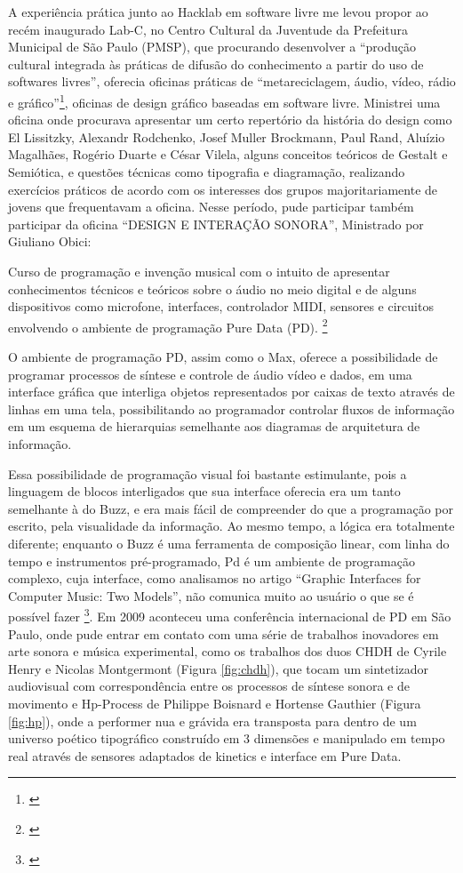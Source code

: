A experiência prática junto ao Hacklab em software livre me levou propor ao recém inaugurado Lab-C, no Centro Cultural da Juventude da Prefeitura Municipal de São Paulo (PMSP), que procurando desenvolver a ``produção cultural integrada às práticas de difusão do conhecimento a partir do uso de softwares livres'', oferecia oficinas práticas de ``metareciclagem, áudio, vídeo, rádio e gráfico''\footnote{\cite{PMSP2008}}, oficinas de design gráfico baseadas em software livre. Ministrei uma oficina onde procurava apresentar um certo repertório da história do design como El Lissitzky, Alexandr Rodchenko, Josef Muller Brockmann, Paul Rand, Aluízio Magalhães, Rogério Duarte e César Vilela, alguns conceitos teóricos de Gestalt e Semiótica, e questões técnicas como tipografia e diagramação, realizando exercícios práticos de acordo com os interesses dos grupos majoritariamente de jovens que frequentavam a oficina. Nesse período, pude participar também participar da oficina ``DESIGN E INTERAÇÃO SONORA'', Ministrado por Giuliano Obici:
\begin{citacao}
Curso de programação e invenção musical com o intuito de apresentar conhecimentos técnicos e teóricos sobre o áudio no meio digital e de alguns dispositivos como microfone, interfaces, controlador MIDI, sensores e circuitos envolvendo o ambiente de programação Pure Data (PD). \footnote{\cite{PMSP2008}}
\end{citacao}

O ambiente de programação PD, assim como o Max, oferece a possibilidade de programar processos de síntese e controle de áudio vídeo e dados, em uma interface gráfica que interliga objetos representados por caixas de texto através de linhas em uma tela, possibilitando ao programador controlar fluxos de informação em um esquema de hierarquias semelhante aos diagramas de arquitetura de informação. 

Essa possibilidade de programação visual foi bastante estimulante, pois a linguagem de blocos interligados que sua interface oferecia era um tanto semelhante à do Buzz, e era mais fácil de compreender do que a programação por escrito, pela visualidade da informação. Ao mesmo tempo, a lógica era totalmente diferente; enquanto o Buzz é uma ferramenta de composição linear, com linha do tempo e instrumentos pré-programado, Pd é um ambiente de programação complexo, cuja interface, como analisamos no artigo ``Graphic Interfaces for Computer Music: Two Models'', não comunica muito ao usuário o que se é possível fazer \footnote{\cite{Stolfi2016}}. 
Em 2009 aconteceu uma conferência internacional de PD em São Paulo, onde pude entrar em contato com uma série de trabalhos inovadores em arte sonora e música experimental, como os trabalhos dos duos CHDH de Cyrile Henry e Nicolas Montgermont (Figura \ref{fig:chdh}), que tocam um sintetizador audiovisual com correspondência entre os processos de síntese sonora e de movimento e Hp-Process de Philippe Boisnard e Hortense Gauthier (Figura \ref{fig:hp}), onde a performer nua e grávida era transposta para dentro de um universo poético tipográfico construído em 3 dimensões e manipulado em tempo real através de sensores adaptados de kinetics e interface em Pure Data. 

